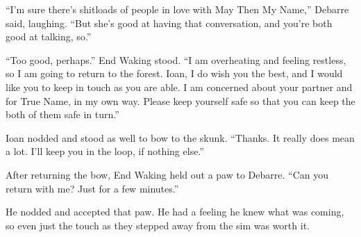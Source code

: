 ``I'm sure there's shitloads of people in love with May Then My Name,'' Debarre said, laughing. ``But she's good at having that conversation, and you're both good at talking, so.''

``Too good, perhaps.'' End Waking stood. ``I am overheating and feeling restless, so I am going to return to the forest. Ioan, I do wish you the best, and I would like you to keep in touch as you are able. I am concerned about your partner and for True Name, in my own way. Please keep yourself safe so that you can keep the both of them safe in turn.''

Ioan nodded and stood as well to bow to the skunk. ``Thanks. It really does mean a lot. I'll keep you in the loop, if nothing else.''

After returning the bow, End Waking held out a paw to Debarre. ``Can you return with me? Just for a few minutes.''

He nodded and accepted that paw. He had a feeling he knew what was coming, so even just the touch as they stepped away from the sim was worth it.
